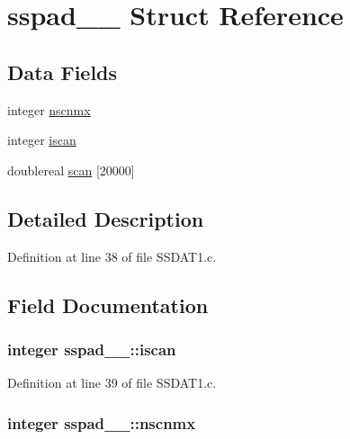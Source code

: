 \hypertarget{structsspad__1__}{}\section{sspad\+\_\+\_\+ Struct Reference}
\label{structsspad__1__}
\subsection*{Data Fields}
\begin{DoxyCompactItemize}
\item 
integer \hyperlink{structsspad__1___a0d309a7f4a1da683fd451db8e7de11e5}{nscnmx}
\item 
integer \hyperlink{structsspad__1___ae0d74a1342f50dd5caf7bccae93a3d07}{iscan}
\item 
doublereal \hyperlink{structsspad__1___ae17dfd942ea952afda78c1cd4edb8eb3}{scan} \mbox{[}20000\mbox{]}
\end{DoxyCompactItemize}


\subsection{Detailed Description}


Definition at line 38 of file S\+S\+D\+A\+T1.\+c.



\subsection{Field Documentation}
\subsubsection[{\texorpdfstring{iscan}{iscan}}]{\setlength{\rightskip}{0pt plus 5cm}integer sspad\+\_\+\_\+\+::iscan}\hypertarget{structsspad__1___ae0d74a1342f50dd5caf7bccae93a3d07}{}\label{structsspad__1___ae0d74a1342f50dd5caf7bccae93a3d07}


Definition at line 39 of file S\+S\+D\+A\+T1.\+c.

\subsubsection[{\texorpdfstring{nscnmx}{nscnmx}}]{\setlength{\rightskip}{0pt plus 5cm}integer sspad\+\_\+\_\+\+::nscnmx}\hypertarget{structsspad__1___a0d309a7f4a1da683fd451db8e7de11e5}{}\label{structsspad__1___a0d309a7f4a1da683fd451db8e7de11e5}


